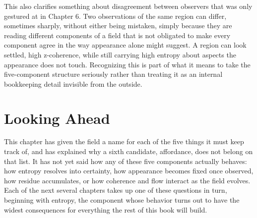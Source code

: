 This also clarifies something about disagreement between observers that was only gestured at in Chapter 6. Two observations of the same region can differ, sometimes sharply, without either being mistaken, simply because they are reading different components of a field that is not obligated to make every component agree in the way appearance alone might suggest. A region can look settled, high z-coherence, while still carrying high entropy about aspects the appearance does not touch. Recognizing this is part of what it means to take the five-component structure seriously rather than treating it as an internal bookkeeping detail invisible from the outside.

\section{Looking Ahead}

This chapter has given the field a name for each of the five things it must keep track of, and has explained why a sixth candidate, affordance, does not belong on that list. It has not yet said how any of these five components actually behaves: how entropy resolves into certainty, how appearance becomes fixed once observed, how residue accumulates, or how coherence and flow interact as the field evolves. Each of the next several chapters takes up one of these questions in turn, beginning with entropy, the component whose behavior turns out to have the widest consequences for everything the rest of this book will build.
